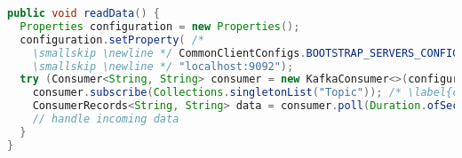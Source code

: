 
\begin{lstlisting}[language=Java, caption={Example of reading data using Kafka Consumer}, label={code:kafka:consumer}]
public void readData() {
  Properties configuration = new Properties();
  configuration.setProperty( /*
    \smallskip \newline */ CommonClientConfigs.BOOTSTRAP_SERVERS_CONFIG, /*
    \smallskip \newline */ "localhost:9092");
  try (Consumer<String, String> consumer = new KafkaConsumer<>(configuration)) {
    consumer.subscribe(Collections.singletonList("Topic")); /* \label{code:kafka:consumer:subscribe} */
    ConsumerRecords<String, String> data = consumer.poll(Duration.ofSeconds(1)); /* \label{code:kafka:consumer:poll} */
    // handle incoming data
  }
}
\end{lstlisting}
